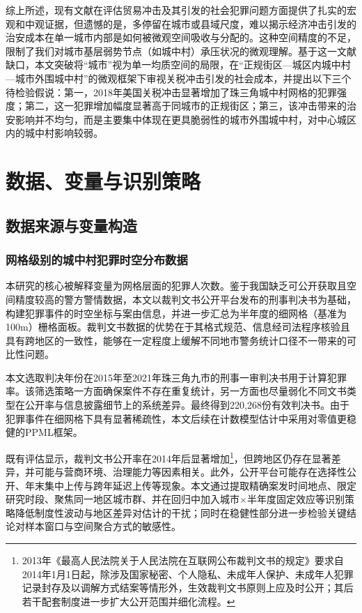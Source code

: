 \documentclass[a4paper,12pt]{report}
\begin{document}
综上所述，现有文献在评估贸易冲击及其引发的社会犯罪问题方面提供了扎实的宏观和中观证据，但遗憾的是，多停留在城市或县域尺度，难以揭示经济冲击引发的治安成本在单一城市内部是如何被微观空间吸收与分配的。这种空间精度的不足，限制了我们对城市基层弱势节点（如城中村）承压状况的微观理解。基于这一文献缺口，本文突破将“城市”视为单一均质空间的局限，在“正规街区—城区内城中村—城市外围城中村”的微观框架下审视关税冲击引发的社会成本，并提出以下三个待检验假说：第一，2018年美国关税冲击显著增加了珠三角城中村网格的犯罪强度；第二，这一犯罪增加幅度显著高于同城市的正规街区；第三，该冲击带来的治安影响并不均匀，而是主要集中体现在更具脆弱性的城市外围城中村，对中心城区内的城中村影响较弱。

\chapter{数据、变量与识别策略}

\section{数据来源与变量构造}
\subsection{网格级别的城中村犯罪时空分布数据}
本研究的核心被解释变量为网格层面的犯罪人次数。鉴于我国缺乏可公开获取且空间精度较高的警方警情数据，本文以裁判文书公开平台发布的刑事判决书为基础，构建犯罪事件的时空坐标与案由信息，并进一步汇总为半年度的细网格（基准为100m）栅格面板。裁判文书数据的优势在于其格式规范、信息经司法程序核验且具有跨地区的一致性，能够在一定程度上缓解不同地市警务统计口径不一带来的可比性问题\citep{zhang2025llm}。

本文选取判决年份在2015年至2021年珠三角九市的刑事一审判决书用于计算犯罪率。该筛选策略一方面确保案件不存在重复统计，另一方面也尽量弱化不同文书类型在公开率与信息披露细节上的系统差异。最终得到220,268份有效判决书。由于犯罪事件在细网格下具有显著稀疏性，本文后续在计数模型估计中采用对零值更稳健的PPML框架\citep{santosSilva2006ppml}。

既有评估显示，裁判文书公开率在2014年后显著增加\footnote{2013年《最高人民法院关于人民法院在互联网公布裁判文书的规定》要求自2014年1月1日起，除涉及国家秘密、个人隐私、未成年人保护、未成年人犯罪记录封存及以调解方式结案等情形外，生效裁判文书原则上应及时公开；其后若干配套制度进一步扩大公开范围并细化流程。}，但跨地区仍存在显著差异，并可能与营商环境、治理能力等因素相关\citep{tang2018open, machao2016report}。此外，公开平台可能存在选择性公开、年末集中上传与跨年延迟上传等现象。本文通过提取精确案发时间地点、限定研究时段、聚焦同一地区城市群、并在回归中加入城市$\times$半年度固定效应等识别策略降低制度性波动与地区差异对估计的干扰；同时在稳健性部分进一步检验关键结论对样本窗口与空间聚合方式的敏感性。
\end{document}
